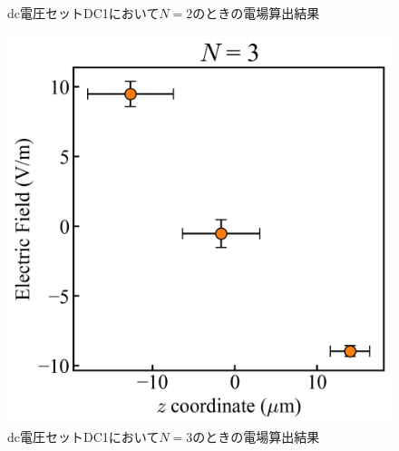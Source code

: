 \begin{figure}[h]
\begin{minipage}{0.33\linewidth}
\begin{center}
			\caption{dc電圧セットDC1において$N=2$のときの電場算出結果}
			\label{fig:DC1_N2}
		\end{center}
	\end{minipage}
	\begin{minipage}{0.33\linewidth}
		\begin{center}
			\includegraphics[width = 0.9\columnwidth]{./results/figure/DC1_N3.jpg}
			\caption{dc電圧セットDC1において$N=3$のときの電場算出結果}
			\label{fig:DC1_N3}
		\end{center}
	\end{minipage}
\end{figure}

